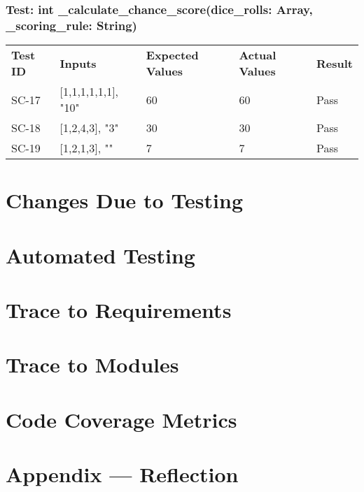 \documentclass[12pt, titlepage]{article}
\begin{document}
\subsubsection{Test: int \_calculate\_chance\_score(dice\_rolls: Array, \_scoring\_rule: String)}
\begin{tabularx}{\textwidth}{|p{2cm}|p{3.5cm}|p{4cm}|p{4cm}|p{1.5cm}|}
    \cline{1-5}
    \textbf{Test ID} & \textbf{Inputs} & \textbf{Expected Values} & \textbf{Actual Values} & \textbf{Result} \\
    \cline{1-5}
    SC-17 & [1,1,1,1,1,1], "10" & 60 & 60 & Pass \\
    \cline{1-5}
    SC-18 & [1,2,4,3], "3" & 30 & 30 & Pass \\
    \cline{1-5}
    SC-19 & [1,2,1,3], "" & 7 & 7 & Pass \\
    \cline{1-5}
\end{tabularx}

\newpage
\section{Changes Due to Testing}


\newpage
\section{Automated Testing}


\newpage
\section{Trace to Requirements}
	
\newpage
\section{Trace to Modules}		

\newpage
\section{Code Coverage Metrics}




\newpage{}
\section*{Appendix --- Reflection}
\end{document}
